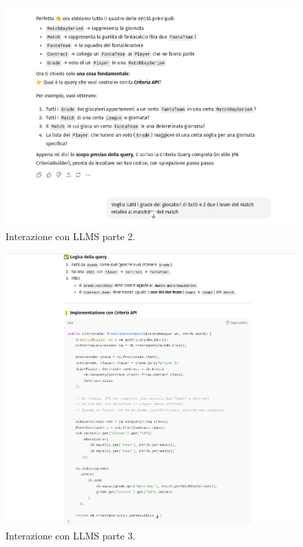 \begin{figure}
    \centering
    \includegraphics[width=\textwidth]{Resources/InterazioneLLMS/InterazioneParte2.png}        
    \caption{Interazione con LLMS parte 2.}
    \label{fig:interazione_con_LLMS_parte_2}
\end{figure}
\begin{figure}
    \centering
    \includegraphics[width=\textwidth]{Resources/InterazioneLLMS/InterazioneParte3.png}        
    \caption{Interazione con LLMS parte 3.}
    \label{fig:interazione_con_LLMS_parte_3}
\end{figure}
